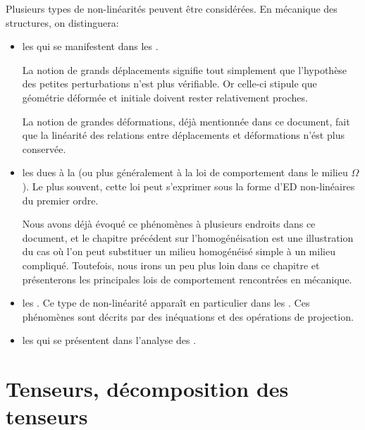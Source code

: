 Plusieurs types de non-linéarités peuvent être considérées. En mécanique des structures, on distinguera:
\begin{itemize}
      \item les  qui se manifestent dans les 
	.

	La notion de \og grands\fg{} déplacements signifie tout simplement que l'hypothèse des petites perturbations
	n'est plus vérifiable. Or celle-ci stipule que géométrie déformée et initiale doivent rester relativement 
	proches. 

	La notion de grandes déformations, déjà mentionnée dans ce document, fait que la linéarité des 
	relations entre déplacements et déformations n'ést plus conservée.

\item les  dues à la  (ou plus généralement à la loi de comportement dans le milieu $\Omega$). 
	Le plus souvent, cette loi peut s'exprimer sous la forme d'ED non-linéaires du premier ordre.

	Nous avons déjà évoqué ce phénomènes à plusieurs endroits dans ce document,
	et le chapitre précédent sur l'homogénéisation est une illustration du cas où l'on  peut
	substituer un milieu homogénéisé simple à un milieu compliqué. Toutefois, nous irons
	un peu plus loin dans ce chapitre et présenterons les principales lois de comportement
	rencontrées en mécanique.

   \item les . 
	Ce type de non-linéarité apparaît en particulier dans les . 
	Ces phénomènes sont décrits par des inéquations et des opérations de projection.

   \item les  qui se présentent dans 
	l'analyse des  .
\end{itemize}




\medskip
\section{Tenseurs, décomposition des tenseurs}

